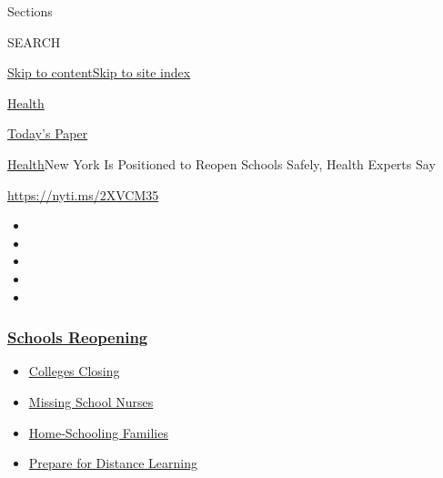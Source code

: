 Sections

SEARCH

\protect\hyperlink{site-content}{Skip to
content}\protect\hyperlink{site-index}{Skip to site index}

\href{https://www.nytimes3xbfgragh.onion/section/health}{Health}

\href{https://myaccount.nytimes3xbfgragh.onion/auth/login?response_type=cookie\&client_id=vi}{}

\href{https://www.nytimes3xbfgragh.onion/section/todayspaper}{Today's
Paper}

\href{/section/health}{Health}\textbar{}New York Is Positioned to Reopen
Schools Safely, Health Experts Say

\url{https://nyti.ms/2XVCM35}

\begin{itemize}
\item
\item
\item
\item
\item
\end{itemize}

\hypertarget{schools-reopening}{%
\subsubsection{\texorpdfstring{\href{https://www.nytimes3xbfgragh.onion/spotlight/schools-reopening?name=styln-coronavirus-schools-reopening\&region=TOP_BANNER\&variant=undefined\&block=storyline_menu_recirc\&action=click\&pgtype=Article\&impression_id=0b947230-e39d-11ea-ae05-3598fe08e800}{Schools
Reopening}}{Schools Reopening}}\label{schools-reopening}}

\begin{itemize}
\tightlist
\item
  \href{https://www.nytimes3xbfgragh.onion/2020/08/19/us/colleges-closing-covid.html?name=styln-coronavirus-schools-reopening\&region=TOP_BANNER\&variant=undefined\&block=storyline_menu_recirc\&action=click\&pgtype=Article\&impression_id=0b947231-e39d-11ea-ae05-3598fe08e800}{Colleges
  Closing}
\item
  \href{https://www.nytimes3xbfgragh.onion/2020/08/20/us/schools-reopening-nurses-covid.html?name=styln-coronavirus-schools-reopening\&region=TOP_BANNER\&variant=undefined\&block=storyline_menu_recirc\&action=click\&pgtype=Article\&impression_id=0b947232-e39d-11ea-ae05-3598fe08e800}{Missing
  School Nurses}
\item
  \href{https://www.nytimes3xbfgragh.onion/2020/08/18/parenting/homeschool-families.html?name=styln-coronavirus-schools-reopening\&region=TOP_BANNER\&variant=undefined\&block=storyline_menu_recirc\&action=click\&pgtype=Article\&impression_id=0b949940-e39d-11ea-ae05-3598fe08e800}{Home-Schooling
  Families}
\item
  \href{https://www.nytimes3xbfgragh.onion/2020/08/05/parenting/parents-distance-learning.html?name=styln-coronavirus-schools-reopening\&region=TOP_BANNER\&variant=undefined\&block=storyline_menu_recirc\&action=click\&pgtype=Article\&impression_id=0b949941-e39d-11ea-ae05-3598fe08e800}{Prepare
  for Distance Learning}
\end{itemize}

